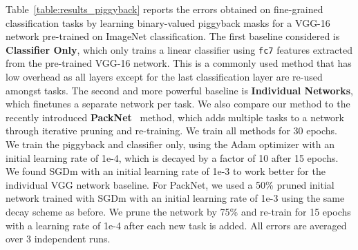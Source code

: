 \documentclass{llncs}
\begin{document}
Table~\ref{table:results_piggyback} reports the errors obtained on fine-grained classification tasks by learning binary-valued piggyback masks for a VGG-16 network pre-trained on ImageNet classification. 
The first baseline considered is {\bf Classifier Only}, which only trains a linear classifier using \texttt{fc7} features extracted from the pre-trained VGG-16 network. This is a commonly used method that has low overhead as all layers except for the last classification layer are re-used amongst tasks.
The second and more powerful baseline is {\bf Individual Networks}, which finetunes a separate network per task. We also compare our method to the recently introduced {\bf PackNet}~\cite{mallya2017packnet} method, which adds multiple tasks to a network through iterative pruning and re-training. 
We train all methods for 30 epochs. We train the piggyback and classifier only, using the Adam optimizer with an initial learning rate of 1e-4, which is decayed by a factor of 10 after 15 epochs. We found SGDm with an initial learning rate of 1e-3 to work better for the individual VGG network baseline.
For PackNet, we used a 50\% pruned initial network trained with SGDm with an initial learning rate of 1e-3 using the same decay scheme as before.
We prune the network by 75\% and re-train for 15 epochs with a learning rate of 1e-4 after each new task is added. All errors are averaged over 3 independent runs.
\end{document}
